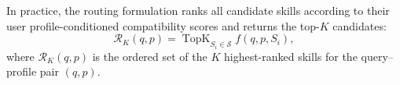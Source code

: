 \documentclass[letterpaper]{article} %
\begin{document}
In practice, the routing formulation ranks all candidate skills according to their
user profile-conditioned compatibility scores and returns the top-$K$ candidates:
\begin{equation}
\mathcal{R}_K(q,p)
=
\operatorname{TopK}_{S_i\in\mathcal{S}}
f(q,p,S_i),
\label{eq:personalized_topk_routing}
\end{equation}
where $\mathcal{R}_K(q,p)$ is the ordered set of the $K$ highest-ranked
skills for the query--profile pair $(q,p)$.





\end{document}
